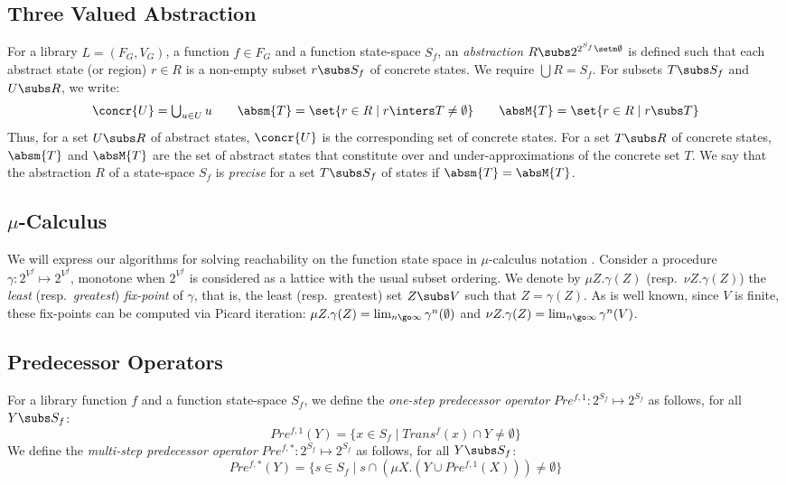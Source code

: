 \documentclass{llncs}
\begin{document}
\subsection{Three Valued Abstraction} 
For a library $L=(F_G,V_G)$, a function $f \in F_G$ and a function state-space $S_f$, 
an {\em abstraction\/} $R  \subs 2^{2^{S_f} \setm \emptyset}$ is defined such that
each abstract state (or region) $r \in R$ is a non-empty subset $r \subs S_f$ of
concrete states.   
We require $\bigcup R = S_f$.  
For subsets $T \subs S_f$ and $U \subs R$, we write: 
\[
  \concr{U} = \textstyle \bigcup_{u \in U} u 
  \qquad
  \absm{T}  = \set{r \in R \mid r \inters T \neq \emptyset} 
  \qquad
  \absM{T}  = \set{r \in R \mid r \subs T}
\]
Thus, for a set $U \subs R$ of abstract states, $\concr{U}$
is the corresponding set of concrete states. 
For a set $T \subs R$ of concrete states, $\absm{T}$ and 
$\absM{T}$ are the set of abstract states that constitute over and
under-approximations of the concrete set $T$. 
We say that the abstraction $R$ of a state-space $S_f$ is 
{\em precise\/} for a set $T \subs S_f$ of states if 
$\absm{T} = \absM{T}$. 

\subsection{$\mu$-Calculus}
We will express our algorithms for solving reachability on the function state
space in $\mu$-calculus notation \cite{EmersonJutla91}. 
Consider a procedure $\gamma: 2^{V^f} \mapsto 2^{V^f}$, monotone when $2^{V^f}$ is
considered as a lattice with the usual subset ordering. 
We denote by $\mu Z. \gamma (Z)$ (resp.\ $\nu Z. \gamma (Z)$) 
the {\em least\/} (resp.\ {\em greatest\/}) {\em fix-point\/} of
$\gamma$, that is, the least (resp.\ greatest) set $Z \subs V$ such 
that $Z = \gamma (Z)$. 
As is well known, since $V$ is finite, these fix-points can be computed
via Picard iteration: 
$\mu Z . \gamma (Z) = \lim_{n \go \infty} \gamma^n (\emptyset)$ and 
$\nu Z . \gamma (Z) = \lim_{n \go \infty} \gamma^n (V)$. 


\subsection{Predecessor Operators}
For a library function $f$ and a function state-space $S_f$,  
we define the  {\em one-step predecessor operator\/}
$Pre^{f,1} : 2^{S_f} \mapsto 2^{S_f}$ as follows, for all $Y \subs S_f$: 
\begin{equation}\label{pref}
  Pre^{f,1} (Y) = \{ x \in S_f \mid Trans^f (x) \cap Y \neq \emptyset\}
\end{equation}
We define the  {\em multi-step predecessor operator\/}
$Pre^{f,*} : 2^{S_f} \mapsto 2^{S_f}$ as follows, for all $Y \subs S_f$: 
\begin{equation}\label{pref-global}
  Pre^{f, *} (Y)  = \{ s \in S_f \mid  s \cap (\mu X. (Y \cup Pre^{f,1}(X))) \neq \emptyset\}
\end{equation}
\end{document}
